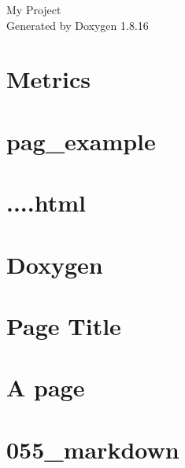 \let\mypdfximage\pdfximage\def\pdfximage{\immediate\mypdfximage}\documentclass[twoside]{book}
\newcommand{\+}{\discretionary{\mbox{\scriptsize$\hookleftarrow$}}{}{}}
\newcommand{\clearemptydoublepage}{%
  \newpage{\pagestyle{empty}\cleardoublepage}%
}
\begin{document}
\hypersetup{pageanchor=false,
             bookmarksnumbered=true,
             pdfencoding=unicode
            }
\begin{titlepage}
\vspace*{7cm}
\begin{center}%
{\Large My Project }\\
\vspace*{1cm}
{\large Generated by Doxygen 1.8.16}\\
\end{center}
\end{titlepage}
\clearemptydoublepage
{}
\tableofcontents
\clearemptydoublepage
{}
\hypersetup{pageanchor=true}

\chapter{Metrics}
\label{index}\hypertarget{index}{}
\chapter{pag\+\_\+example}
\label{pag_example}

\chapter{....html}
\label{features}

\chapter{Doxygen}
\label{md_doxygen__r_e_a_d_m_e}

\chapter{Page Title}
\label{mypage}

\chapter{A page}
\label{item2}

\chapter{055\+\_\+markdown}
\label{md_doxygen_testing_055_markdown}

\end{document}
